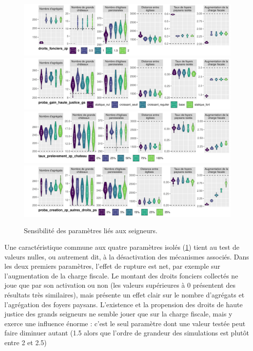 \begin{figure}[H]
	\centering
	\includegraphics[width=\linewidth]{img/sensib/sensibilite_droits_fonciers_zp.pdf}
	\includegraphics[width=\linewidth]{img/sensib/sensibilite_proba_gain_haute_justice_gs.pdf}
	\includegraphics[width=\linewidth]{img/sensib/sensibilite_taux_prelevement_zp_chateau.pdf}
	\includegraphics[width=\linewidth]{img/sensib/sensibilite_proba_creation_zp_autres_droits_ps.pdf}
	\caption{Sensibilité des paramètres liés aux seigneurs.}
	\label{fig:sensib-seigneurs}
\end{figure}

Une caractéristique commune aux quatre paramètres isolés (\cref{fig:sensib-seigneurs}) tient au test de valeurs nulles, ou autrement dit, à la désactivation des mécanismes associés.
Dans les deux premiers paramètres, l'effet de rupture est net, par exemple sur l'augmentation de la charge fiscale.
Le montant des droits fonciers collectés ne joue que par son activation ou non (les valeurs supérieures à 0 présentent des résultats très similaires), mais présente un effet clair sur le nombre d'agrégats et l'agrégation des foyers paysans.
L'existence et la propension des droits de haute justice des grands seigneurs ne semble jouer que sur la charge fiscale, mais y exerce une influence énorme : c'est le seul paramètre dont une valeur testée peut faire diminuer autant (1.5 alors que l'ordre de grandeur des simulations est plutôt entre 2 et 2.5)

